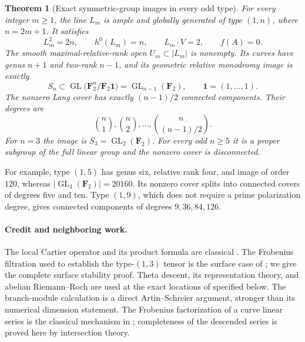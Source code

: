 \documentclass[11pt]{article}
\newtheorem{theorem}{Theorem}[section]
\theoremstyle{remark}\newtheorem{remark}[theorem]{Remark}
\newcommand{\FF}{\mathbf F}
\newcommand{\GL}{\operatorname{GL}}
\begin{document}
\begin{theorem}[Exact symmetric-group images in every odd type]\label{thm:odd}
For every integer $m\ge1$, the line $L_m$ is ample and globally generated of type $(1,n)$, where $n=2m+1$. It satisfies
\[
 L_m^2=2n,\qquad h^0(L_m)=n,\qquad L_m\cdot V=2,
 \qquad f(A)=0.
\]
The smooth maximal-relative-rank open $U_m\subset|L_m|$ is nonempty. Its curves have genus $n+1$ and two-rank $n-1$, and its geometric relative monodromy image is exactly
\begin{equation}\label{eq:Sn}
 S_n\subset\GL\bigl(\FF_2^n/\FF_2\mathbf1\bigr)
          =\GL_{n-1}(\FF_2),
 \qquad \mathbf1=(1,\ldots,1).
\end{equation}
The nonzero Lang cover has exactly $(n-1)/2$ connected components. Their degrees are
\begin{equation}\label{eq:degrees}
 \binom n1,\binom n2,\ldots,\binom n{(n-1)/2}.
\end{equation}
For $n=3$ the image is $S_3=\GL_2(\FF_2)$. For every odd $n\ge5$ it is a proper subgroup of the full linear group and the nonzero cover is disconnected.
\end{theorem}

For example, type $(1,5)$ has genus six, relative rank four, and image of order $120$, whereas $|\GL_4(\FF_2)|=20160$. Its nonzero cover splits into connected covers of degrees five and ten. Type $(1,9)$, which does not require a prime polarization degree, gives connected components of degrees $9,36,84,126$.

\paragraph{Credit and neighboring work.}
The local Cartier operator and its product formula are classical \citep[0, (2.1.4)--(2.1.13), pp.~514--515]{Illusie}. The Frobenius filtration used to establish the type-$(1,3)$ tensor is the surface case of \citet[Definition~3.1, Lemmas~3.2--3.5 and Theorem~3.6, pp.~5--9]{Sun}; we give the complete surface stability proof. Theta descent, its representation theory, and abelian Riemann--Roch are used at the exact locations of \citet[\S\S8--9]{EGM} specified below. The branch-module calculation is a direct Artin--Schreier argument, stronger than its numerical dimension statement. The Frobenius factorization of a curve linear series is the classical mechanism in \citet[Lemma~53.13.8, full proof]{StacksFrob}; completeness of the descended series is proved here by intersection theory.
\end{document}
